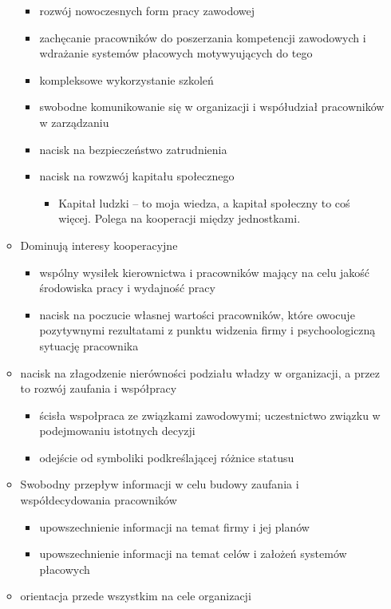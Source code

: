 \documentclass[a4paper,10pt]{report}
\begin{document}
\begin{itemize}
\begin{itemize}
		\begin{itemize}
			\item rozwój nowoczesnych form pracy zawodowej
			\item zachęcanie pracowników do poszerzania kompetencji zawodowych i wdrażanie systemów płacowych motywyujących do tego
			\item kompleksowe wykorzystanie szkoleń
			\item swobodne komunikowanie się w organizacji i współudział pracowników w zarządzaniu
			\item nacisk na bezpieczeństwo zatrudnienia
			\item nacisk na rowzwój kapitału społecznego
			\begin{itemize}
				\item Kapitał ludzki -- to moja wiedza, a kapitał społeczny to coś więcej. Polega na kooperacji między jednostkami.
			\end{itemize}
		\end{itemize}
		\item Dominują interesy kooperacyjne
		\begin{itemize}
			\item wspólny wysiłek kierownictwa i pracowników mający na celu jakość środowiska pracy i wydajność pracy
			\item nacisk na poczucie własnej wartości pracowników, które owocuje pozytywnymi rezultatami z punktu widzenia firmy i psychoologiczną sytuację pracownika
		\end{itemize}
		\item nacisk na złagodzenie nierówności podziału władzy w organizacji, a przez to rozwój zaufania i współpracy
		\begin{itemize}
			\item ścisła wspołpraca ze związkami zawodowymi; uczestnictwo związku w podejmowaniu istotnych decyzji
			\item odejście od symboliki podkreślającej różnice statusu
		\end{itemize}
		\item Swobodny przepływ informacji w celu budowy zaufania i współdecydowania pracowników
		\begin{itemize}
			\item upowszechnienie informacji na temat firmy i jej planów
			\item upowszechnienie informacji na temat celów i założeń systemów płacowych
		\end{itemize}
		\item orientacja przede wszystkim na cele organizacji

\end{itemize}
\end{itemize}
\end{document}
